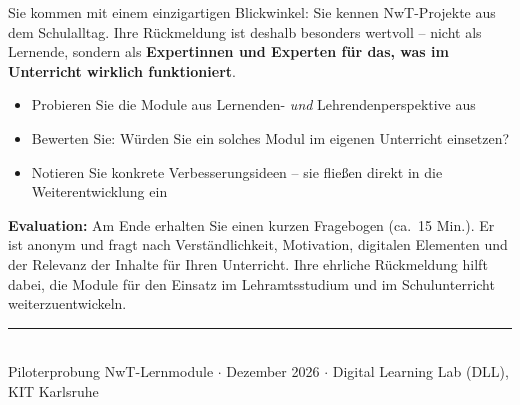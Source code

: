 \documentclass[a4paper,10pt]{article}
\newcommand{\linefill}{\rule{\linewidth}{0.4pt}}
\begin{document}
Sie kommen mit einem einzigartigen Blickwinkel: Sie kennen NwT-Projekte aus dem Schulalltag.
Ihre Rückmeldung ist deshalb besonders wertvoll – nicht als Lernende,
sondern als \textbf{Expertinnen und Experten für das, was im Unterricht wirklich funktioniert}.

\vspace{6pt}

\begin{itemize}[leftmargin=1.4em, itemsep=2pt]
  \item Probieren Sie die Module aus Lernenden- \emph{und} Lehrendenperspektive aus
  \item Bewerten Sie: Würden Sie ein solches Modul im eigenen Unterricht einsetzen?
  \item Notieren Sie konkrete Verbesserungsideen – sie fließen direkt in die Weiterentwicklung ein
\end{itemize}

\vspace{10pt}

\begin{tcolorbox}[
  colback=lightgray, colframe=midgray, arc=2mm,
  boxrule=0.6pt, top=5pt, bottom=5pt, left=8pt, right=8pt
]
{\bfseries Evaluation:} Am Ende erhalten Sie einen kurzen Fragebogen (ca.\ 15 Min.).
Er ist anonym und fragt nach Verständlichkeit, Motivation, digitalen Elementen
und der Relevanz der Inhalte für Ihren Unterricht.
Ihre ehrliche Rückmeldung hilft dabei, die Module für den Einsatz im
Lehramtsstudium und im Schulunterricht weiterzuentwickeln.
\end{tcolorbox}

\vspace{8pt}

\linefill\\[4pt]
{\small \color{midgray}
Piloterprobung NwT-Lernmodule $\cdot$ Dezember 2026 $\cdot$
Digital Learning Lab (DLL), KIT Karlsruhe
}
\end{document}
